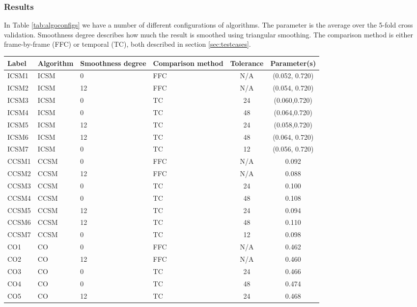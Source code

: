 \documentclass[12pt]{article}
\begin{document}
\subsubsection{Results}
%
In Table \ref{tab:algoconfigs} we have a number of different configurations of algorithms. The parameter is the average over the 5-fold cross validation. Smoothness degree describes how much the result is smoothed using triangular smoothing. The comparison method is either frame-by-frame (FFC) or temporal (TC), both described in section \ref{sec:testcases}.\\
%
\begin{table}
  \begin{tabular}{| l | l | p{2cm} | p{2cm} | c | c | }\hline
    Label & Algorithm & Smoothness degree & Comparison method & Tolerance & Parameter(s)\\\hline
    ICSM1 & ICSM & 0 & FFC & N/A & (0.052, 0.720) \\\hline
    ICSM2 & ICSM & 12 & FFC & N/A & (0.054, 0.720) \\\hline
    ICSM3 & ICSM & 0 & TC & 24 & (0.060,0.720) \\\hline
    ICSM4 & ICSM & 0 & TC & 48 & (0.064,0.720) \\\hline
    ICSM5 & ICSM & 12 & TC & 24 & (0.058,0.720) \\\hline
    ICSM6 & ICSM & 12 & TC & 48 & (0.064, 0.720) \\\hline
    ICSM7 & ICSM & 0 & TC & 12 & (0.056, 0.720) \\\hline\hline
%
    CCSM1 & CCSM & 0 & FFC & N/A & 0.092 \\\hline
    CCSM2 & CCSM & 12 & FFC & N/A & 0.088 \\\hline
    CCSM3 & CCSM & 0 & TC & 24 & 0.100 \\\hline
    CCSM4 & CCSM & 0 & TC & 48 & 0.108 \\\hline
    CCSM5 & CCSM & 12 & TC & 24 & 0.094 \\\hline
    CCSM6 & CCSM & 12 & TC & 48 & 0.110 \\\hline
    CCSM7 & CCSM & 0 & TC & 12 & 0.098 \\\hline\hline
%
    CO1 & CO & 0 & FFC & N/A & 0.462 \\\hline
    CO2 & CO & 12 & FFC & N/A & 0.460 \\\hline
    CO3 & CO & 0 & TC & 24 & 0.466 \\\hline
    CO4 & CO & 0 & TC & 48 & 0.474 \\\hline
    CO5 & CO & 12 & TC & 24 & 0.468 \\\hline

\end{tabular}
\end{table}
\end{document}
